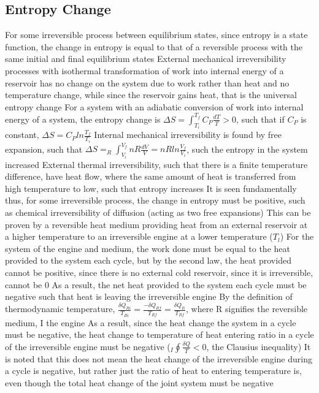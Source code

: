 \documentclass[11 pt, twoside]{article}
\newenvironment{outline*}
{
	\begin{outline}[enumerate]
	}
	{\end{outline}
}
\begin{document}
\subsection{Entropy Change}
\begin{outline*}
\1 For some irreversible process between equilibrium states, since entropy is a state function, the change in entropy is equal to that of a reversible process with the same initial and final equilibrium states
\2 External mechanical irreversibility processes with isothermal transformation of work into internal energy of a reservoir has no change on the system due to work rather than heat and no temperature change, while since the reservoir gains heat, that is the universal entropy change
\3 For a system with an adiabatic conversion of work into internal energy of a system, the entropy change is $\Delta S = \int^{T_f}_{T_i} C_P \frac{dT}{T} > 0$, such that if $C_P$ is constant, $\Delta S = C_P ln\frac{T_f}{T_i}$
\2 Internal mechanical irreversibility is found by free expansion, such that $\Delta S = _R\int_{V_i}^{V_f} nR \frac{dV}{V} = nR ln\frac{V_f}{V_i}$, such the entropy in the system increased
\2 External thermal irreversibility, such that there is a finite temperature difference, have heat flow, where the same amount of heat is transferred from high temperature to low, such that entropy increases
\2 It is seen fundamentally thus, for some irreversible process, the change in entropy must be positive, such as chemical irreversibility of diffusion (acting as two free expansions)
\2 This can be proven by a reversible heat medium providing heat from an external reservoir at a higher temperature to an irreversible engine at a lower temperature ($T_l$)
\3 For the system of the engine and medium, the work done must be equal to the heat provided to the system each cycle, but by the second law, the heat provided cannot be positive, since there is no external cold reservoir, since it is irreversible, cannot be 0
\3 As a result, the net heat provided to the system each cycle must be negative such that heat is leaving the irreversible engine
\3 By the definition of thermodynamic temperature, $\frac{\delta Q_{Ri}}{T_{Ri}} = \frac{-\delta Q_{Rf}}{T_{Rf}} = \frac{\delta Q_{Ii}}{T_{Rf}}$, where R signifies the reversible medium, I the engine
\3 As a result, since the heat change the system in a cycle must be negative, the heat change to temperature of heat entering ratio in a cycle of the irreversible engine must be negative ($_I\oint \frac{\delta Q}{T} < 0$, the Clausius inequality)
\3 It is noted that this does not mean the heat change of the irreversible engine during a cycle is negative, but rather just the ratio of heat to entering temperature is, even though the total heat change of the joint system must be negative

\end{outline*}
\end{document}
